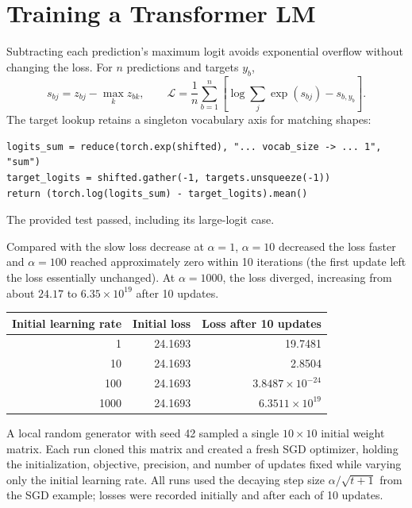 \section{Training a Transformer LM}


Subtracting each prediction's maximum
logit avoids exponential overflow without changing the loss. For $n$
predictions and targets $y_b$,
\[
s_{bj}=z_{bj}-\max_k z_{bk},\qquad
\mathcal{L}=\frac1n\sum_{b=1}^{n}
\left[\log\sum_j\exp(s_{bj})-s_{b,y_b}\right].
\]
The target lookup retains a singleton vocabulary axis for matching shapes:
\par\noindent
\begin{minipage}{\linewidth}
\begin{lstlisting}[caption={Stable cross-entropy after shifting logits}]
logits_sum = reduce(torch.exp(shifted), "... vocab_size -> ... 1", "sum")
target_logits = shifted.gather(-1, targets.unsqueeze(-1))
return (torch.log(logits_sum) - target_logits).mean()
\end{lstlisting}
\end{minipage}\par
The provided test passed, including its large-logit case.




Compared with the slow loss decrease at $\alpha=1$, $\alpha=10$
decreased the loss faster and $\alpha=100$ reached approximately zero within
10 iterations (the first update left the loss essentially unchanged).
At $\alpha=1000$, the loss diverged, increasing from about $24.17$ to
$6.35\times10^{19}$ after 10 updates.

\begin{center}
\begin{tabular}{rrr}
\toprule
Initial learning rate & Initial loss & Loss after 10 updates \\
\midrule
1 & 24.1693 & 19.7481 \\
10 & 24.1693 & 2.8504 \\
100 & 24.1693 & $3.8487\times10^{-24}$ \\
1000 & 24.1693 & $6.3511\times10^{19}$ \\
\bottomrule
\end{tabular}
\end{center}
A local random generator with seed 42 sampled a single $10\times10$ initial
weight matrix. Each run cloned this matrix and created a fresh SGD optimizer,
holding the initialization, objective, precision, and number of updates fixed
while varying only the initial learning rate. All runs used the decaying step
size $\alpha/\sqrt{t+1}$ from the SGD example; losses were recorded initially
and after each of 10 updates.


